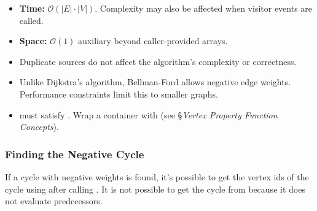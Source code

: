 \begin{itemdescr}
\begin{itemize}
            \end{itemize}
      \pnum\complexity
            \begin{itemize}
                  \item \textbf{Time:} $\mathcal{O}(|E| \cdot |V|)$. Complexity may also be affected when visitor events are called.
                  \item \textbf{Space:} $\mathcal{O}(1)$ auxiliary beyond caller-provided arrays.
            \end{itemize}
      \pnum\remarks 
            \begin{itemize}
                  \item Duplicate sources do not affect the algorithm's complexity or correctness.
                  \item Unlike Dijkstra's algorithm, Bellman-Ford allows negative edge weights.
                        Performance constraints limit this to smaller graphs.
                  \item {} must satisfy .  Wrap a
                        container with 
                        (see §\textit{Vertex Property Function Concepts}).
            \end{itemize}
\end{itemdescr}

\subsubsection{Finding the Negative Cycle}
If a cycle with negative weights is found, it's possible to get the vertex ids of the cycle
using  after calling . It is
not possible to get the cycle from  because it does
not evaluate predecessors.

